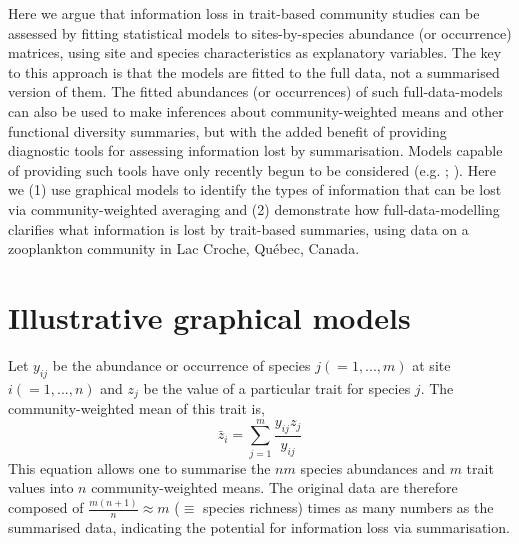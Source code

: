 \documentclass[12pt]{ecology}
\begin{document}
Here we argue that information loss in trait-based community studies can be assessed by fitting statistical models to sites-by-species abundance (or occurrence) matrices, using site and species characteristics as explanatory variables.  The key to this approach is that the models are fitted to the full data, not a summarised version of them.  The fitted abundances (or occurrences) of such full-data-models can also be used to make inferences about community-weighted means and other functional diversity summaries, but with the added benefit of providing diagnostic tools for assessing information lost by summarisation.  Models capable of providing such tools have only recently begun to be considered (e.g. ; ).  Here we (1) use graphical models to identify the types of information that can be lost via community-weighted averaging and (2) demonstrate how full-data-modelling clarifies what information is lost by trait-based summaries, using data on a zooplankton community in Lac Croche, Qu\'{e}bec, Canada.


\section{Illustrative graphical models}
\label{sec:graphmod}

Let $y_{ij}$ be the abundance or occurrence of species $j (= 1, ..., m)$ at site $i (= 1, ..., n)$ and $z_j$ be the value of a particular trait for species $j$.  The community-weighted mean of this trait is, \newpage
\begin{equation} 
\bar{z}_i = \sum_{j=1}^m \frac{y_{ij} z_j}{y_{ij}}
\label{eq:cwmdef}
\end{equation}
This equation allows one to summarise the $nm$ species abundances and $m$ trait values into $n$ community-weighted means.  The original data are therefore composed of $\frac{m(n + 1)}{n} \approx m$ ($\equiv$ species richness) times as many numbers as the summarised data, indicating the potential for information loss via summarisation.

\end{document}
